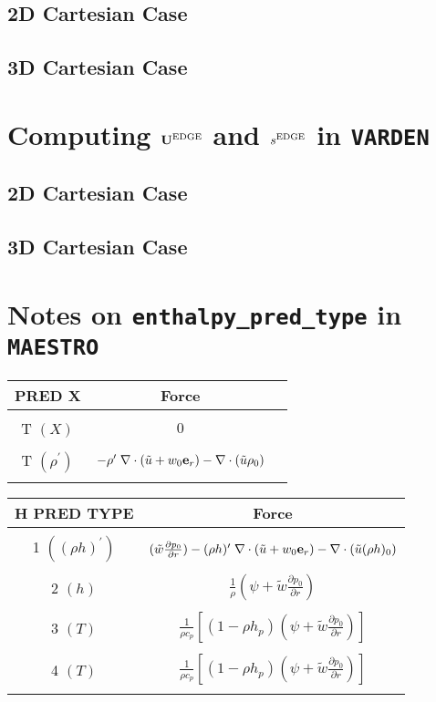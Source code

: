 \documentclass[11pt]{article}
\def\edge  {\rm EDGE}
\def\eb    {{\bf e}}
\def\Ub    {{\bf U}}
\def\ut    {\tilde{u}}
\begin{document}
\subsection{2D Cartesian Case}
\subsection{3D Cartesian Case}
\cleardoublepage
\section{Computing $\Ub^{\edge}$ and $s^{\edge}$ in {\tt VARDEN}}
\subsection{2D Cartesian Case}
\subsection{3D Cartesian Case}
\cleardoublepage
\section{Notes on {\tt enthalpy\_pred\_type} in {\tt MAESTRO}}
\begin{table*}
\begin{center}
\caption{Forcing term into make edge scal \newline}
\begin{tabular}{|c|c|c|}
\multicolumn{1}{c}{PRED X}   & \multicolumn{1}{c}{Force} \\
\hline
  &   \\
T $(X)$ & $0$ \\
  &   \\
T $(\rho^\prime)$ & $-\rho^\prime \; \nabla \cdot (\ut+w_0 \eb_r) - \nabla \cdot (\ut \rho_0) $  \\
  &   \\
\hline
\end{tabular}
\end{center}
\begin{center}
\begin{tabular}{|c|c|}
\multicolumn{1}{c}{H PRED TYPE}   & \multicolumn{1}{c}{Force} \\
\hline
   & \\
 1 $((\rho h)^\prime)$ &  $(\tilde{w} \frac{\partial p_0}{\partial r}) - (\rho h)^\prime \; \nabla \cdot (\ut+w_0 \eb_r) - \nabla \cdot (\ut (\rho h)_0) $  \\
   & \\
 2 $(h)$ & $\frac{1}{\rho} (\psi + \tilde{w} \frac{\partial p_0}{\partial r})$  \\
   & \\
 3 $(T)$ & $\frac{1}{\rho c_p} \left[ (1 - \rho h_p) (\psi + \tilde{w} \frac{\partial p_0}{\partial r}) \right]$ \\
   & \\
 4 $(T)$ & $\frac{1}{\rho c_p} \left[ (1 - \rho h_p) (\psi + \tilde{w} \frac{\partial p_0}{\partial r}) \right]$ \\
   & \\
\hline
\end{tabular}
\end{center}
\end{table*}
\end{document}
